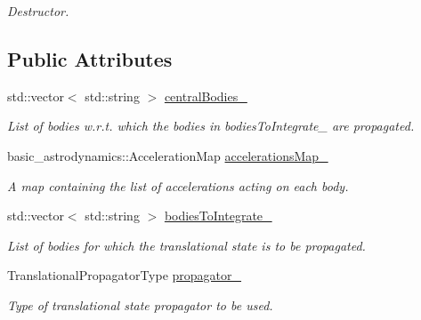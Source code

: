 \begin{DoxyCompactItemize}
\begin{DoxyCompactList}\small\item\em Destructor. \end{DoxyCompactList}\end{DoxyCompactItemize}
\subsection*{Public Attributes}
\begin{DoxyCompactItemize}
\item 
std\+::vector$<$ std\+::string $>$ \hyperlink{classtudat_1_1propagators_1_1TranslationalStatePropagatorSettings_a7ef1b42d37f93e969bb1680991f16358}{central\+Bodies\+\_\+}\hypertarget{classtudat_1_1propagators_1_1TranslationalStatePropagatorSettings_a7ef1b42d37f93e969bb1680991f16358}{}\label{classtudat_1_1propagators_1_1TranslationalStatePropagatorSettings_a7ef1b42d37f93e969bb1680991f16358}

\begin{DoxyCompactList}\small\item\em List of bodies w.\+r.\+t. which the bodies in bodies\+To\+Integrate\+\_\+ are propagated. \end{DoxyCompactList}\item 
basic\+\_\+astrodynamics\+::\+Acceleration\+Map \hyperlink{classtudat_1_1propagators_1_1TranslationalStatePropagatorSettings_a2c77c941e83de803bb29c4aa6ffc9090}{accelerations\+Map\+\_\+}
\begin{DoxyCompactList}\small\item\em A map containing the list of accelerations acting on each body. \end{DoxyCompactList}\item 
std\+::vector$<$ std\+::string $>$ \hyperlink{classtudat_1_1propagators_1_1TranslationalStatePropagatorSettings_aa5b9afdbcbc04292756abe448798037a}{bodies\+To\+Integrate\+\_\+}\hypertarget{classtudat_1_1propagators_1_1TranslationalStatePropagatorSettings_aa5b9afdbcbc04292756abe448798037a}{}\label{classtudat_1_1propagators_1_1TranslationalStatePropagatorSettings_aa5b9afdbcbc04292756abe448798037a}

\begin{DoxyCompactList}\small\item\em List of bodies for which the translational state is to be propagated. \end{DoxyCompactList}\item 
Translational\+Propagator\+Type \hyperlink{classtudat_1_1propagators_1_1TranslationalStatePropagatorSettings_a5d5b921fb25985f835926c8998c0bdc1}{propagator\+\_\+}\hypertarget{classtudat_1_1propagators_1_1TranslationalStatePropagatorSettings_a5d5b921fb25985f835926c8998c0bdc1}{}\label{classtudat_1_1propagators_1_1TranslationalStatePropagatorSettings_a5d5b921fb25985f835926c8998c0bdc1}

\begin{DoxyCompactList}\small\item\em Type of translational state propagator to be used. \end{DoxyCompactList}\end{DoxyCompactItemize}
